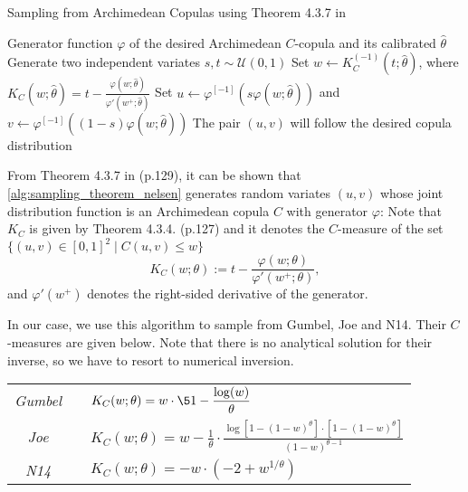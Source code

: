 
\begin{algorithm}[H]
\caption{Sampling from Archimedean Copulas using Theorem 4.3.7 in \cite{Nelsen2006}}
\label{alg:sampling_theorem_nelsen}
\begin{algorithmic}[1]
\Require Generator function $\varphi$ of the desired Archimedean $C$-copula and its calibrated $\hat \theta$
\State Generate two independent variates $s,t\sim\mathcal U(0,1)$
\State Set $w \gets K_C^{(-1)}(t;\hat \theta)$, where 
$\displaystyle K_C(w;\hat \theta) = t - \frac{\varphi(w;\hat \theta)}{\varphi'(w^+;\hat \theta)}$
\State Set $u \gets \varphi^{[-1]}(s\varphi(w;\hat \theta))$ and $v \gets \varphi^{[-1]}((1-s)\varphi(w;\hat \theta))$
\Ensure The pair $(u,v)$ will follow the desired copula distribution
\end{algorithmic}
\end{algorithm}
From Theorem 4.3.7 in \cite{Nelsen2006} (p.129), it can be shown that \cref{alg:sampling_theorem_nelsen} generates random variates $(u,v)$ whose joint distribution function is an Archimedean copula $C$ with generator $\varphi$: %
Note that $K_C$ is given by Theorem 4.3.4. (p.127) and it denotes the $C$-measure of the set $\{(u,v)\in [0,1]^2 \mid C(u,v)\leq w\}$
$$
K_C(w; \theta) := t - \frac{\varphi(w; \theta)}{\varphi'(w^+; \theta)},
$$ 
and ${\varphi'(w^+)}$ denotes the right-sided derivative of the generator.

In our case, we use this algorithm to sample from Gumbel, Joe and N14. Their $C$-measures are given  below. Note that there is no analytical solution for their inverse, so we have to resort to numerical inversion.

\vspace{0.2cm}
{\centering
\renewcommand{\arraystretch}{1.8}  
\begin{tabular}{ccp{10cm}}
\textit{Gumbel} && $\displaystyle K_C(w; \theta)=w \cdot \5{1- \frac{\log (w)}{\theta}}$ 
\\
\textit{Joe} && $\displaystyle K_C(w; \theta) = w - \frac{1}{\theta} 
\cdot 
\frac{\log[1-(1-w)^{\theta}] \cdot [1-(1-w)^{\theta}]}
{(1-w)^{\theta-1}}$ 
\\
\textit{N14} && $\displaystyle K_C(w; \theta) = -w \cdot (-2 + w^{1/\theta})$ 
\\
\end{tabular}
\par}


